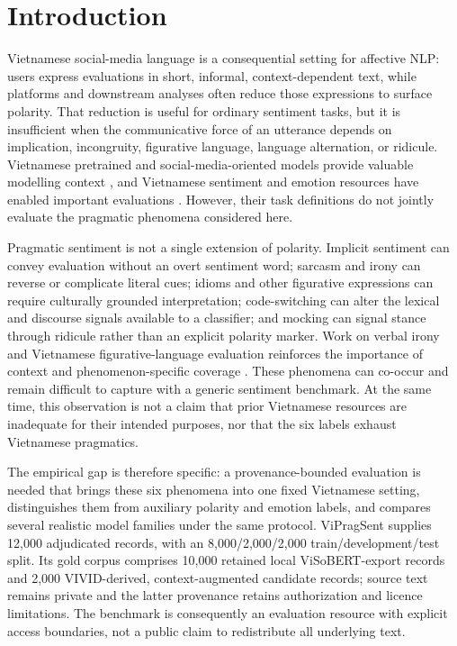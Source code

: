 \section{Introduction}
\label{sec:introduction}

Vietnamese social-media language is a consequential setting for affective NLP: users express evaluations in short, informal, context-dependent text, while platforms and downstream analyses often reduce those expressions to surface polarity. That reduction is useful for ordinary sentiment tasks, but it is insufficient when the communicative force of an utterance depends on implication, incongruity, figurative language, language alternation, or ridicule. Vietnamese pretrained and social-media-oriented models provide valuable modelling context \citep{nguyen-tuan-nguyen-2020-phobert,conneau-etal-2020-unsupervised,nguyen-etal-2023-visobert}, and Vietnamese sentiment and emotion resources have enabled important evaluations \citep{nguyen-etal-2018-uit-vsfc,ho-etal-2020-uit-vsmec,tran-etal-2026-vigoemotions}. However, their task definitions do not jointly evaluate the pragmatic phenomena considered here.

Pragmatic sentiment is not a single extension of polarity. Implicit sentiment can convey evaluation without an overt sentiment word; sarcasm and irony can reverse or complicate literal cues; idioms and other figurative expressions can require culturally grounded interpretation; code-switching can alter the lexical and discourse signals available to a classifier; and mocking can signal stance through ridicule rather than an explicit polarity marker. Work on verbal irony and Vietnamese figurative-language evaluation reinforces the importance of context and phenomenon-specific coverage \citep{ghosh-etal-2020-interpreting,rem-lab-2026-vivid}. These phenomena can co-occur and remain difficult to capture with a generic sentiment benchmark. At the same time, this observation is not a claim that prior Vietnamese resources are inadequate for their intended purposes, nor that the six labels exhaust Vietnamese pragmatics.

The empirical gap is therefore specific: a provenance-bounded evaluation is needed that brings these six phenomena into one fixed Vietnamese setting, distinguishes them from auxiliary polarity and emotion labels, and compares several realistic model families under the same protocol. ViPragSent supplies 12,000 adjudicated records, with an 8,000/2,000/2,000 train/development/test split. Its gold corpus comprises 10,000 retained local ViSoBERT-export records and 2,000 VIVID-derived, context-augmented candidate records; source text remains private and the latter provenance retains authorization and licence limitations. The benchmark is consequently an evaluation resource with explicit access boundaries, not a public claim to redistribute all underlying text.


